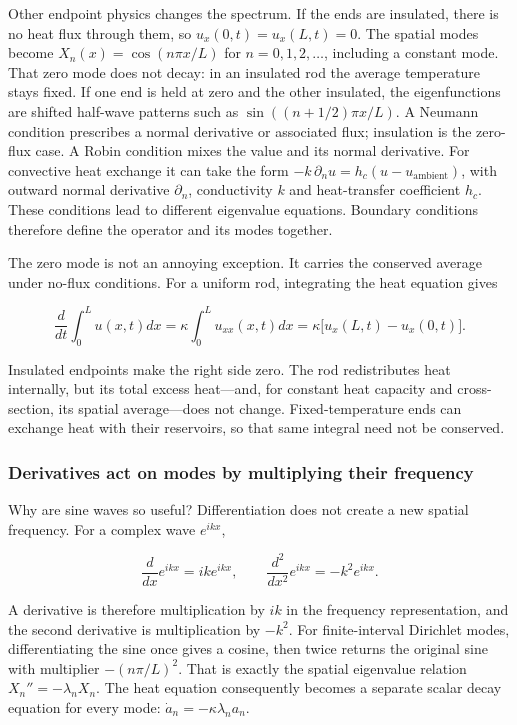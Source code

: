 Other endpoint physics changes the spectrum. If the ends are insulated, there is no heat flux through them, so \(u_x(0,t)=u_x(L,t)=0\). The spatial modes become \(X_n(x)=\cos(n\pi x/L)\) for \(n=0,1,2,\ldots\), including a constant mode. That zero mode does not decay: in an insulated rod the average temperature stays fixed. If one end is held at zero and the other insulated, the eigenfunctions are shifted half-wave patterns such as \(\sin((n+1/2)\pi x/L)\). A Neumann condition prescribes a normal derivative or associated flux; insulation is the zero-flux case. A Robin condition mixes the value and its normal derivative. For convective heat exchange it can take the form \(-k\,\partial_nu=h_c(u-u_{\mathrm{ambient}})\), with outward normal derivative \(\partial_n\), conductivity \(k\) and heat-transfer coefficient \(h_c\). These conditions lead to different eigenvalue equations. Boundary conditions therefore define the operator and its modes together.

The zero mode is not an annoying exception. It carries the conserved average under no-flux conditions. For a uniform rod, integrating the heat equation gives

\[
\frac{d}{dt}\int_0^L u(x,t)dx
=\kappa\int_0^L u_{xx}(x,t)dx
=\kappa\big[u_x(L,t)-u_x(0,t)\big].
\]

Insulated endpoints make the right side zero. The rod redistributes heat internally, but its total excess heat---and, for constant heat capacity and cross-section, its spatial average---does not change. Fixed-temperature ends can exchange heat with their reservoirs, so that same integral need not be conserved.

\subsubsection{Derivatives act on modes by multiplying their frequency}\label{02-foundations-ii-ch025-derivatives-act-on-modes-by-multiplying-their-frequency}

\hypertarget{02-foundations-ii-ch025-derivatives-act-on-modes-by-multiplying-their-frequency}{}

Why are sine waves so useful? Differentiation does not create a new spatial frequency. For a complex wave \(e^{ikx}\),

\[
\frac{d}{dx}e^{ikx}=ik e^{ikx},
\qquad
\frac{d^2}{dx^2}e^{ikx}=-k^2 e^{ikx}.
\]

A derivative is therefore multiplication by \(ik\) in the frequency representation, and the second derivative is multiplication by \(-k^2\). For finite-interval Dirichlet modes, differentiating the sine once gives a cosine, then twice returns the original sine with multiplier \(-(n\pi/L)^2\). That is exactly the spatial eigenvalue relation \(X_n''=-\lambda_nX_n\). The heat equation consequently becomes a separate scalar decay equation for every mode: \(\dot a_n=-\kappa\lambda_na_n\).

